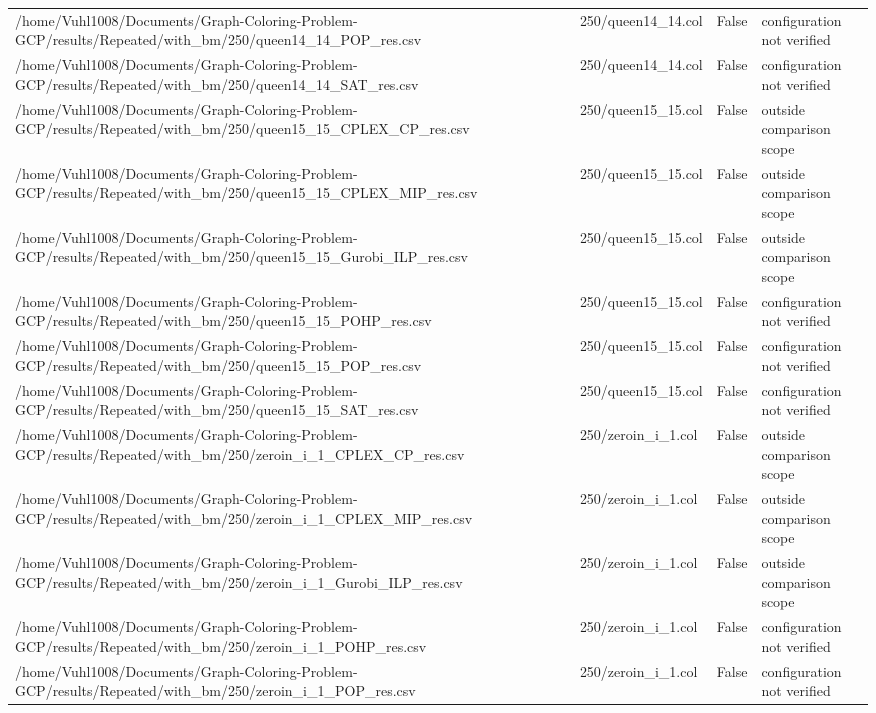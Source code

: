 \begin{table}[htbp]
\begin{tabular}{llll}
/home/Vuhl1008/Documents/Graph-Coloring-Problem-GCP/results/Repeated/with\_bm/250/queen14\_14\_POP\_res.csv & 250/queen14\_14.col & False & configuration not verified \\
/home/Vuhl1008/Documents/Graph-Coloring-Problem-GCP/results/Repeated/with\_bm/250/queen14\_14\_SAT\_res.csv & 250/queen14\_14.col & False & configuration not verified \\
/home/Vuhl1008/Documents/Graph-Coloring-Problem-GCP/results/Repeated/with\_bm/250/queen15\_15\_CPLEX\_CP\_res.csv & 250/queen15\_15.col & False & outside comparison scope \\
/home/Vuhl1008/Documents/Graph-Coloring-Problem-GCP/results/Repeated/with\_bm/250/queen15\_15\_CPLEX\_MIP\_res.csv & 250/queen15\_15.col & False & outside comparison scope \\
/home/Vuhl1008/Documents/Graph-Coloring-Problem-GCP/results/Repeated/with\_bm/250/queen15\_15\_Gurobi\_ILP\_res.csv & 250/queen15\_15.col & False & outside comparison scope \\
/home/Vuhl1008/Documents/Graph-Coloring-Problem-GCP/results/Repeated/with\_bm/250/queen15\_15\_POHP\_res.csv & 250/queen15\_15.col & False & configuration not verified \\
/home/Vuhl1008/Documents/Graph-Coloring-Problem-GCP/results/Repeated/with\_bm/250/queen15\_15\_POP\_res.csv & 250/queen15\_15.col & False & configuration not verified \\
/home/Vuhl1008/Documents/Graph-Coloring-Problem-GCP/results/Repeated/with\_bm/250/queen15\_15\_SAT\_res.csv & 250/queen15\_15.col & False & configuration not verified \\
/home/Vuhl1008/Documents/Graph-Coloring-Problem-GCP/results/Repeated/with\_bm/250/zeroin\_i\_1\_CPLEX\_CP\_res.csv & 250/zeroin\_i\_1.col & False & outside comparison scope \\
/home/Vuhl1008/Documents/Graph-Coloring-Problem-GCP/results/Repeated/with\_bm/250/zeroin\_i\_1\_CPLEX\_MIP\_res.csv & 250/zeroin\_i\_1.col & False & outside comparison scope \\
/home/Vuhl1008/Documents/Graph-Coloring-Problem-GCP/results/Repeated/with\_bm/250/zeroin\_i\_1\_Gurobi\_ILP\_res.csv & 250/zeroin\_i\_1.col & False & outside comparison scope \\
/home/Vuhl1008/Documents/Graph-Coloring-Problem-GCP/results/Repeated/with\_bm/250/zeroin\_i\_1\_POHP\_res.csv & 250/zeroin\_i\_1.col & False & configuration not verified \\
/home/Vuhl1008/Documents/Graph-Coloring-Problem-GCP/results/Repeated/with\_bm/250/zeroin\_i\_1\_POP\_res.csv & 250/zeroin\_i\_1.col & False & configuration not verified \\

\end{tabular}
\end{table}
